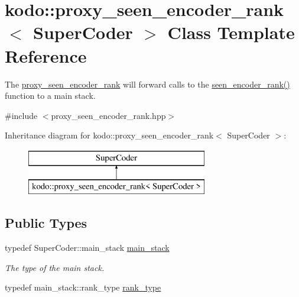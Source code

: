 \hypertarget{classkodo_1_1proxy__seen__encoder__rank}{\section{kodo\-:\-:proxy\-\_\-seen\-\_\-encoder\-\_\-rank$<$ Super\-Coder $>$ Class Template Reference}
\label{classkodo_1_1proxy__seen__encoder__rank}
}


The \hyperlink{classkodo_1_1proxy__seen__encoder__rank}{proxy\-\_\-seen\-\_\-encoder\-\_\-rank} will forward calls to the \hyperlink{classkodo_1_1proxy__seen__encoder__rank_a7c7561fc6d6825fdba4137d044e959c2}{seen\-\_\-encoder\-\_\-rank()} function to a main stack.  




{\ttfamily \#include $<$proxy\-\_\-seen\-\_\-encoder\-\_\-rank.\-hpp$>$}

Inheritance diagram for kodo\-:\-:proxy\-\_\-seen\-\_\-encoder\-\_\-rank$<$ Super\-Coder $>$\-:\begin{figure}[H]
\begin{center}
\leavevmode
\includegraphics[height=2.000000cm]{classkodo_1_1proxy__seen__encoder__rank}
\end{center}
\end{figure}
\subsection*{Public Types}
\begin{DoxyCompactItemize}
\item 
typedef Super\-Coder\-::main\-\_\-stack \hyperlink{classkodo_1_1proxy__seen__encoder__rank_a00472c10591ba80c147de689144bfd72}{main\-\_\-stack}
\begin{DoxyCompactList}\small\item\em The type of the main stack. \end{DoxyCompactList}\item 
typedef main\-\_\-stack\-::rank\-\_\-type \hyperlink{classkodo_1_1proxy__seen__encoder__rank_ae6f4968bbd129624143974c52dcf95cf}{rank\-\_\-type}
\begin{DoxyCompactList}\small\item\em \end{DoxyCompactList}\end{DoxyCompactItemize}
